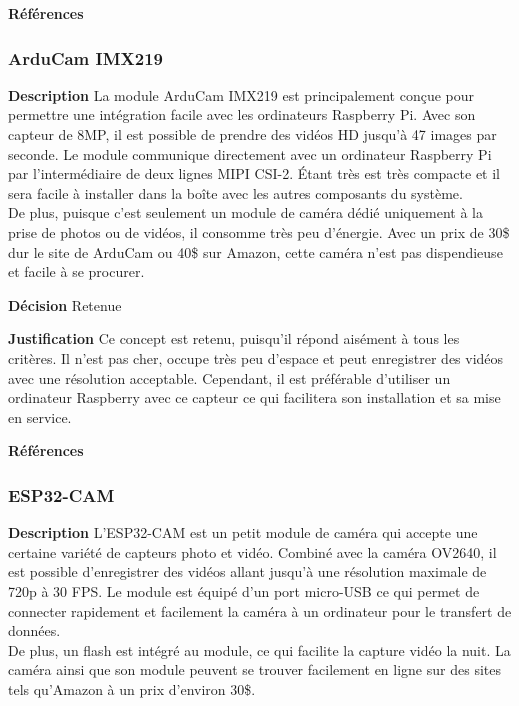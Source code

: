 \noindent\textbf{Références}
\cite{Gopro1}
\cite{Gopro2}

\subsubsection{ArduCam IMX219}
\label{sec:arduc}
\noindent\textbf{Description} La module ArduCam IMX219 est principalement conçue pour permettre une intégration facile avec les ordinateurs Raspberry Pi. Avec son capteur de 8MP, il est possible de prendre des vidéos HD jusqu'à 47 images par seconde. Le module communique directement avec un ordinateur Raspberry Pi par l'intermédiaire de deux lignes MIPI CSI-2. Étant très est très compacte et il sera facile à installer dans la boîte avec les autres composants du système. 
\\

De plus, puisque c'est seulement un module de caméra dédié uniquement à la prise de photos ou de vidéos, il consomme très peu d'énergie. Avec un prix de 30\$ dur le site de ArduCam ou 40\$ sur Amazon, cette caméra n'est pas dispendieuse et facile à se procurer.
\smallskip

\noindent\textbf{Décision} Retenue
\smallskip

\noindent\textbf{Justification} Ce concept est retenu, puisqu'il répond aisément à tous les critères. Il n'est pas cher, occupe très peu d'espace et peut enregistrer des vidéos avec une résolution acceptable. Cependant, il est préférable d'utiliser un ordinateur Raspberry avec ce capteur ce qui facilitera son installation et sa mise en service.
\smallskip

\noindent\textbf{Références} 
\cite{ArduCam1}
\cite{ArduCam2}

\subsubsection{ESP32-CAM}
\label{sec:esp32}
\noindent\textbf{Description} L'ESP32-CAM est un petit module de caméra qui accepte une certaine variété de capteurs photo et vidéo. Combiné avec la caméra OV2640, il est possible d'enregistrer des vidéos allant jusqu'à une résolution maximale de 720p à 30 FPS. Le module est équipé d'un port micro-USB ce qui permet de connecter rapidement et facilement la caméra à un ordinateur pour le transfert de données. 
\\

De plus, un flash est intégré au module, ce qui facilite la capture vidéo la nuit. La caméra ainsi que son module peuvent se trouver facilement en ligne sur des sites tels qu'Amazon à un prix d'environ 30\$.
\smallskip

